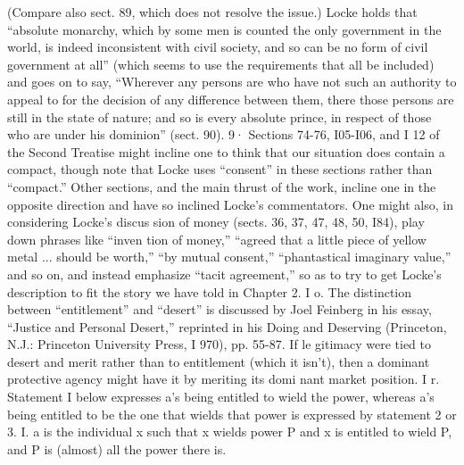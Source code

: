 \documentclass[11pt,openany]{book}
\begin{document}
{(Compare also sect. 89, which does not resolve the issue.) Locke holds that ``absolute monarchy, which by some men is counted the only government in the world, is indeed inconsistent with civil society, and so can be no form of civil government at all'' (which seems to use the requirements that all be included) and goes on to say, ``Wherever any persons are who have not such an authority to appeal to for the decision of any difference between them, there those persons are still in the state of nature; and so is every absolute prince, in respect of those who are under his dominion'' (sect. 90). 9· Sections 74-76, I05-I06, and I 12 of the Second Treatise might incline one to think that our situation does contain a compact, though note that Locke uses ``consent'' in these sections rather than ``compact.'' Other sections, and the main thrust of the work, incline one in the opposite direction and have so inclined Locke's commentators. One might also, in considering Locke's discus sion of money (sects. 36, 37, 47, 48, 50, I84), play down phrases like ``inven tion of money,'' ``agreed that a little piece of yellow metal ... should be worth,'' ``by mutual consent,'' ``phantastical imaginary value,'' and so on, and instead emphasize ``tacit agreement,'' so as to try to get Locke's description to fit the story we have told in Chapter 2. I o. The distinction between ``entitlement'' and ``desert'' is discussed by Joel Feinberg in his essay, ``Justice and Personal Desert,'' reprinted in his Doing and Deserving (Princeton, N.J.: Princeton University Press, I 970), pp. 55-87. If le gitimacy were tied to desert and merit rather than to entitlement (which it isn't), then a dominant protective agency might have it by meriting its domi nant market position. I r. Statement I below expresses a's being entitled to wield the power, whereas a's being entitled to be the one that wields that power is expressed by statement 2 or 3. I. a is the individual x such that x wields power P and x is entitled to wield P, and P is (almost) all the power there is.\par

}
\end{document}

